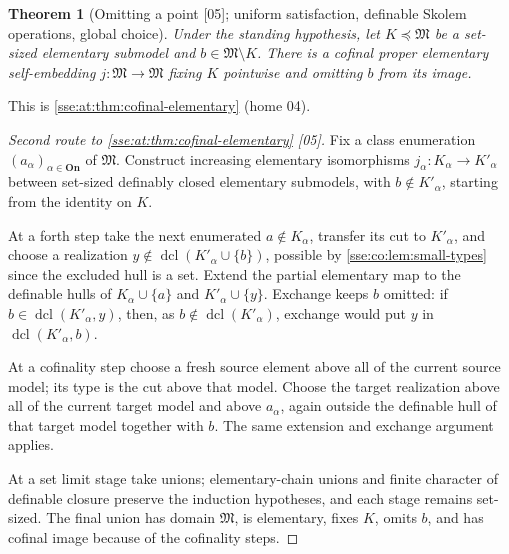 \documentclass[11pt,a4paper]{article}
\numberwithin{equation}{section}
\theoremstyle{plain}
\newtheorem{theorem}{Theorem}[section]
\theoremstyle{definition}
\theoremstyle{remark}
\newcommand{\On}{\mathbf{On}}
\newcommand{\src}[1]{\textup{\textsf{\small[#1]}}}%
\newcommand{\dclco}{\operatorname{dcl}}%
\begin{document}
\begin{theorem}[Omitting a point \src{05}; uniform satisfaction, definable Skolem operations, global choice]\label{sse:co:thm:omit}
Under the standing hypothesis, let $K\preccurlyeq\mathfrak M$ be a set-sized
elementary submodel and $b\in\mathfrak M\setminus K$. There is a cofinal
proper elementary self-embedding $j:\mathfrak M\to\mathfrak M$ fixing $K$
pointwise and omitting $b$ from its image.
\end{theorem}
This is \cref{sse:at:thm:cofinal-elementary} (home 04).
\begin{proof}[Second route to \cref{sse:at:thm:cofinal-elementary} \src{05}]
Fix a class enumeration $(a_\alpha)_{\alpha\in\On}$ of $\mathfrak M$. Construct
increasing elementary isomorphisms $j_\alpha:K_\alpha\to K'_\alpha$ between
set-sized definably closed elementary submodels, with $b\notin K'_\alpha$,
starting from the identity on $K$.

At a forth step take the next enumerated $a\notin K_\alpha$, transfer its
cut to $K'_\alpha$, and choose a realization
$y\notin\dclco(K'_\alpha\cup\{b\})$, possible by \cref{sse:co:lem:small-types}
since the excluded hull is a set. Extend the partial elementary map to the
definable hulls of $K_\alpha\cup\{a\}$ and $K'_\alpha\cup\{y\}$. Exchange
keeps $b$ omitted: if $b\in\dclco(K'_\alpha,y)$, then, as
$b\notin\dclco(K'_\alpha)$, exchange would put $y$ in $\dclco(K'_\alpha,b)$.

At a cofinality step choose a fresh source element above all of the current
source model; its type is the cut above that model. Choose the target
realization above all of the current target model and above $a_\alpha$,
again outside the definable hull of that target model together with $b$. The
same extension and exchange argument applies.

At a set limit stage take unions; elementary-chain unions and finite
character of definable closure preserve the induction hypotheses, and each
stage remains set-sized. The final union has domain $\mathfrak M$, is
elementary, fixes $K$, omits $b$, and has cofinal image because of the
cofinality steps.
\end{proof}
\end{document}
